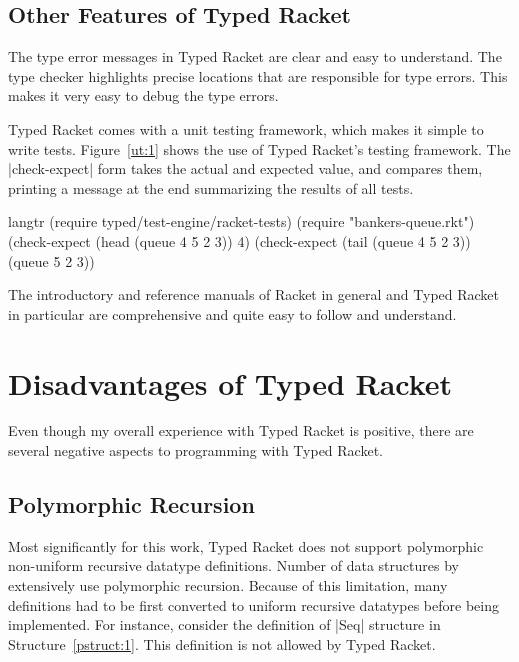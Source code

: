 \subsection*{Other Features of Typed Racket}

The type error messages in Typed Racket are clear and easy to
understand. The type checker highlights precise locations that are
responsible for type errors. This makes it very easy to debug the type
errors.


Typed Racket comes with a unit testing framework, which makes it simple
to write tests. Figure~\ref{ut:1} shows the use of Typed Racket's
testing framework. The \scheme|check-expect| form takes the actual and
expected value, and compares them, printing a message at the end
summarizing the results of all tests.

\begin{figure*}
\begin{plain}
  \begin{schemedisplay}
    langtr
    (require typed/test-engine/racket-tests)
    (require "bankers-queue.rkt")
    (check-expect (head (queue 4 5 2 3)) 4)
    (check-expect (tail (queue 4 5 2 3))
                  (queue 5 2 3))

  \end{schemedisplay}
\end{plain}
\caption{Examples of Unit Tests}
\label{ut:1}
\end{figure*}


The introductory and reference manuals of Racket in general and Typed
Racket in particular are comprehensive and quite easy to follow and
understand.

\section{Disadvantages of Typed Racket}

Even though my overall experience with Typed Racket is positive, there
are several negative aspects to programming with Typed Racket.

\subsection*{Polymorphic Recursion}
Most significantly for this work, Typed Racket does not support
polymorphic non-uniform recursive datatype definitions. Number of data
structures by \citet{oka} extensively use polymorphic recursion.
Because of this limitation, many definitions had to be first converted
to uniform recursive datatypes before being implemented. For instance,
consider the definition of \scheme|Seq| structure in
Structure~\ref{pstruct:1}. This definition is not allowed by Typed
Racket.

